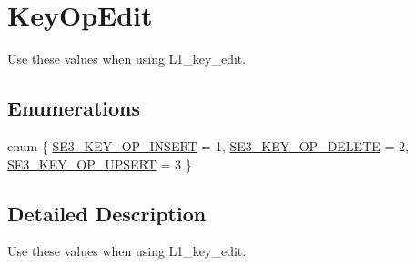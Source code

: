 \hypertarget{group___key_op_edit}{\section{Key\-Op\-Edit}
\label{group___key_op_edit}
}


Use these values when using L1\-\_\-key\-\_\-edit.  


\subsection*{Enumerations}
\begin{DoxyCompactItemize}
\item 
enum \{ \hyperlink{group___key_op_edit_ggaae05225933a42f81e7c4a9fb286596f9a3d657386a013ef10d83cc30169752db3}{S\-E3\-\_\-\-K\-E\-Y\-\_\-\-O\-P\-\_\-\-I\-N\-S\-E\-R\-T} = 1, 
\hyperlink{group___key_op_edit_ggaae05225933a42f81e7c4a9fb286596f9a352566ea8d1d1506d8d90919cab3f42b}{S\-E3\-\_\-\-K\-E\-Y\-\_\-\-O\-P\-\_\-\-D\-E\-L\-E\-T\-E} = 2, 
\hyperlink{group___key_op_edit_ggaae05225933a42f81e7c4a9fb286596f9ab9154fbc25e71f9b88dbeb2b6e173885}{S\-E3\-\_\-\-K\-E\-Y\-\_\-\-O\-P\-\_\-\-U\-P\-S\-E\-R\-T} = 3
 \}
\end{DoxyCompactItemize}


\subsection{Detailed Description}
Use these values when using L1\-\_\-key\-\_\-edit. 

